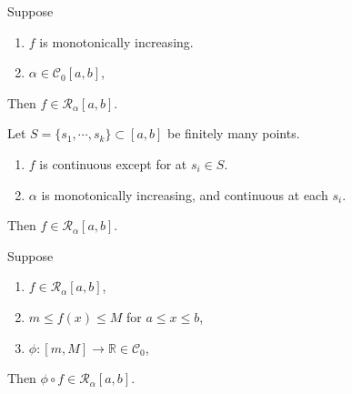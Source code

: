 \begin{theorem}
  Suppose 
  \begin{enumerate}
    \item $ f $ is monotonically increasing.
    \item $ \alpha \in \mathcal{C}_0[a, b]$,
  \end{enumerate}
  Then $ f \in \mathcal{R}_{\alpha}[a, b] $.
\end{theorem}

\begin{theorem}
  Let $ S = \{s_1, \cdots, s_k\} \subset [a, b] $ be finitely many points.
  \begin{enumerate}
    \item $ f $ is continuous except for at $ s_i \in S $.
    \item $ \alpha $ is monotonically increasing, and continuous at each $ s_i $.
  \end{enumerate}
  Then $ f \in \mathcal{R}_{\alpha}[a, b] $.
\end{theorem}

\newpage

\begin{theorem}
  Suppose
  \begin{enumerate}
    \item $ f \in \mathcal{R}_{\alpha}[a, b] $,
    \item $ m \leq f(x) \leq M $ for $ a \leq x \leq b $,
    \item $ \phi\colon[m, M] \to \mathbb{R} \in \mathcal{C}_0 $,
  \end{enumerate}
  Then $ \phi \circ f \in \mathcal{R}_{\alpha}[a, b] $.
\end{theorem}

